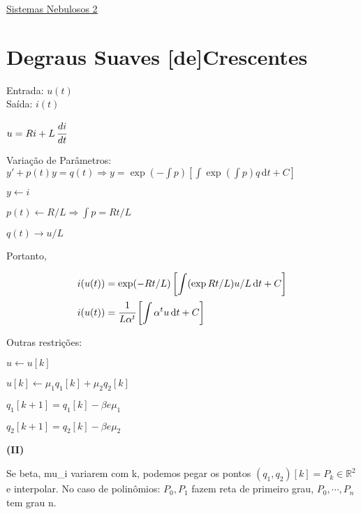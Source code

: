 \documentclass[12pt]{article}
\begin{document}
\Large

\begin{center}
\href{https://www.youtube.com/watch?v=2E0TYW42x1c}{\color{blue}\underline{Sistemas Nebulosos 2}}
\end{center}

\normalsize

\vspace{3mm}

\section{Degraus Suaves [de]Crescentes}

\begin{flushleft}
Entrada: $u(t)$ \\
Sa\'ida: $i(t)$
\end{flushleft}

$u = Ri + L\, \cfrac{di}{dt}$

Varia\c{c}\~ao de Par\^ametros: $y' + p(t) y = q(t) \Rightarrow y = \exp(-\int p) \left[ \int \exp (\int p) q \,\mathrm{d}t + C \right]$

$y \leftarrow i$

$p(t) \leftarrow R/L \Rightarrow \int p = Rt/L$

$q(t) \rightarrow u/L$

Portanto,

\begin{align}
 i(u(t)) &= \exp(-Rt/L) \left[ \int (\exp Rt/L) u/L \,\mathrm{d}t + C \right] \\
 i(u(t)) &= \cfrac{1}{L \alpha^t} \left[ \int \alpha^t u \,\mathrm{d}t + C \right]
\end{align}

Outras restri\c{c}\~oes:

$u \leftarrow u[k]$

$u[k] \leftarrow \mu_1 q_1[k] + \mu_2 q_2[k]$

$q_1[k+1] = q_1[k] - \beta e \mu_1$

$q_2[k+1] = q_2[k] - \beta e \mu_2$

\vspace{3mm}

\textbf{(II)}

Se beta, mu\_i variarem com k, podemos pegar os pontos $(q_1, q_2)[k] = P_k \in \mathbb{R}^2$ e interpolar. No caso de polin\^omios: $P_0, P_1$ fazem reta de primeiro grau, $P_0, \cdots, P_n$ tem grau n.

\vspace{3mm}
\end{document}
